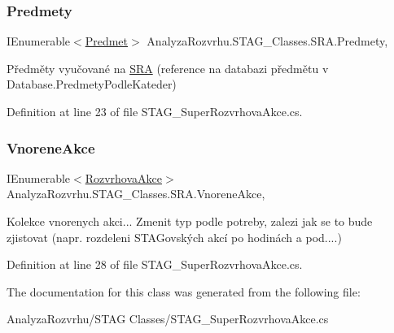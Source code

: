 \subsubsection{\texorpdfstring{Predmety}{Predmety}}
{\footnotesize\ttfamily I\+Enumerable$<$\hyperlink{class_analyza_rozvrhu_1_1_s_t_a_g___classes_1_1_predmet}{Predmet}$>$ Analyza\+Rozvrhu.\+S\+T\+A\+G\+\_\+\+Classes.\+S\+R\+A.\+Predmety\hspace{0.3cm}{\ttfamily [get]}, {\ttfamily [set]}}



Předměty vyučované na \hyperlink{class_analyza_rozvrhu_1_1_s_t_a_g___classes_1_1_s_r_a}{S\+RA} (reference na databazi předmětu v Database.\+Predmety\+Podle\+Kateder) 



Definition at line 23 of file S\+T\+A\+G\+\_\+\+Super\+Rozvrhova\+Akce.\+cs.

\mbox{\label{class_analyza_rozvrhu_1_1_s_t_a_g___classes_1_1_s_r_a_ab1e34b548ffda5bad0b8d23c5a26316e}} 
\subsubsection{\texorpdfstring{Vnorene\+Akce}{VnoreneAkce}}
{\footnotesize\ttfamily I\+Enumerable$<$\hyperlink{class_analyza_rozvrhu_1_1_s_t_a_g___classes_1_1_rozvrhova_akce}{Rozvrhova\+Akce}$>$ Analyza\+Rozvrhu.\+S\+T\+A\+G\+\_\+\+Classes.\+S\+R\+A.\+Vnorene\+Akce\hspace{0.3cm}{\ttfamily [get]}, {\ttfamily [set]}}



Kolekce vnorenych akci... Zmenit typ podle potreby, zalezi jak se to bude zjistovat (napr. rozdeleni S\+T\+A\+Govských akcí po hodinách a pod....) 



Definition at line 28 of file S\+T\+A\+G\+\_\+\+Super\+Rozvrhova\+Akce.\+cs.



The documentation for this class was generated from the following file\+:\begin{DoxyCompactItemize}
\item 
Analyza\+Rozvrhu/\+S\+T\+A\+G Classes/S\+T\+A\+G\+\_\+\+Super\+Rozvrhova\+Akce.\+cs\end{DoxyCompactItemize}

